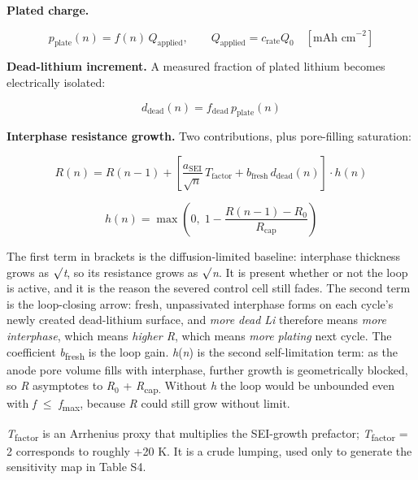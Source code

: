 \documentclass[11pt,a4paper]{article}
\begin{document}
\textbf{Plated charge.}


\begin{equation}p_{\text{plate}}(n) = f(n)\,Q_{\text{applied}},\qquad Q_{\text{applied}} = c_{\text{rate}}Q_0 \quad[\text{mAh cm}^{-2}] \tag{S1.E4}\end{equation}


\textbf{Dead-lithium increment.} A measured fraction of plated lithium becomes electrically isolated:


\begin{equation}d_{\text{dead}}(n) = f_{\text{dead}}\,p_{\text{plate}}(n) \tag{S1.E5}\end{equation}


\textbf{Interphase resistance growth.} Two contributions, plus pore-filling saturation:


\begin{equation}R(n) = R(n-1) + \left[\frac{a_{\text{SEI}}}{\sqrt{n}}\,T_{\text{factor}} + b_{\text{fresh}}\,d_{\text{dead}}(n)\right]\cdot h(n) \tag{S1.E6}\end{equation}


\begin{equation}h(n) = \max\!\left(0,\;1-\frac{R(n-1)-R_0}{R_{\text{cap}}}\right) \tag{S1.E7}\end{equation}


The first term in brackets is the diffusion-limited baseline: interphase thickness grows as \ensuremath{\surd}\emph{t}, so its resistance grows as \ensuremath{\surd}\emph{n}. It is present whether or not the loop is active, and it is the reason the severed control cell still fades. The second term is the loop-closing arrow: fresh, unpassivated interphase forms on each cycle's newly created dead-lithium surface, and \emph{more dead Li} therefore means \emph{more interphase}, which means \emph{higher R}, which means \emph{more plating} next cycle. The coefficient \emph{b}\textsubscript{fresh} is the loop gain. \emph{h}(\emph{n}) is the second self-limitation term: as the anode pore volume fills with interphase, further growth is geometrically blocked, so \emph{R} asymptotes to \emph{R}\ensuremath{_{0}} + \emph{R}\textsubscript{cap.} Without \emph{h} the loop would be unbounded even with \emph{f} \ensuremath{\leq} \emph{f}\textsubscript{max}, because \emph{R} could still grow without limit.


\emph{T}\textsubscript{factor} is an Arrhenius proxy that multiplies the SEI-growth prefactor; \emph{T}\textsubscript{factor} = 2 corresponds to roughly +20 K. It is a crude lumping, used only to generate the sensitivity map in Table S4.
\end{document}
